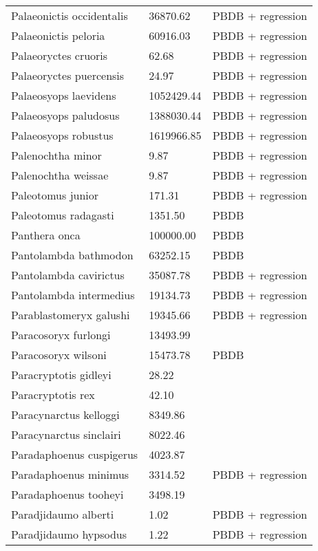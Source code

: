 \documentclass{article}
\begin{document}
\begin{center}
\begin{longtable}{p{} p{} p{}}
    Palaeonictis occidentalis & 36870.62 & PBDB + regression \\ 
    Palaeonictis peloria & 60916.03 & PBDB + regression \\ 
    Palaeoryctes cruoris & 62.68 & PBDB + regression \\ 
    Palaeoryctes puercensis & 24.97 & PBDB + regression \\ 
    Palaeosyops laevidens & 1052429.44 & PBDB + regression \\ 
    Palaeosyops paludosus & 1388030.44 & PBDB + regression \\ 
    Palaeosyops robustus & 1619966.85 & PBDB + regression \\ 
    Palenochtha minor & 9.87 & PBDB + regression \\ 
    Palenochtha weissae & 9.87 & PBDB + regression \\ 
    Paleotomus junior & 171.31 & PBDB + regression \\ 
    Paleotomus radagasti & 1351.50 & PBDB \\ 
    Panthera onca & 100000.00 & PBDB \\ 
    Pantolambda bathmodon & 63252.15 & PBDB \\ 
    Pantolambda cavirictus & 35087.78 & PBDB + regression \\ 
    Pantolambda intermedius & 19134.73 & PBDB + regression \\ 
    Parablastomeryx galushi & 19345.66 & PBDB + regression \\ 
    Paracosoryx furlongi & 13493.99 & \cite{Tomiya2013} \\ 
    Paracosoryx wilsoni & 15473.78 & PBDB \\ 
    Paracryptotis gidleyi & 28.22 & \cite{Tomiya2013} \\ 
    Paracryptotis rex & 42.10 & \cite{Tomiya2013} \\ 
    Paracynarctus kelloggi & 8349.86 & \cite{Tomiya2013} \\ 
    Paracynarctus sinclairi & 8022.46 & \cite{Tomiya2013} \\ 
    Paradaphoenus cuspigerus & 4023.87 & \cite{Tomiya2013} \\ 
    Paradaphoenus minimus & 3314.52 & PBDB + regression \\ 
    Paradaphoenus tooheyi & 3498.19 & \cite{Tomiya2013} \\ 
    Paradjidaumo alberti & 1.02 & PBDB + regression \\ 
    Paradjidaumo hypsodus & 1.22 & PBDB + regression \\ 

\end{longtable}
\end{center}
\end{document}
